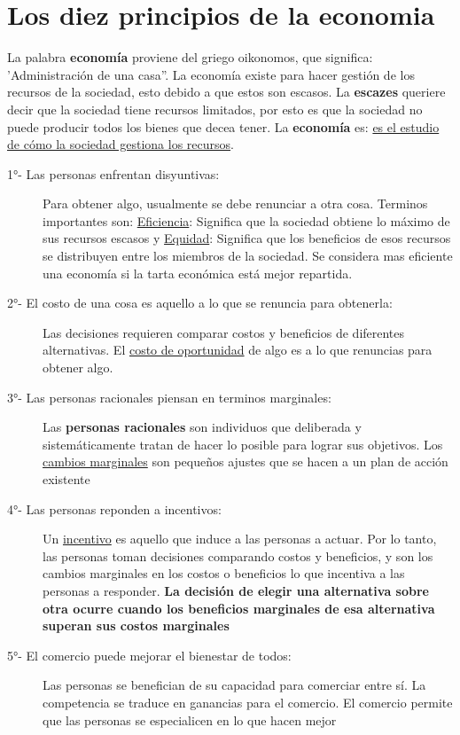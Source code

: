 \newpage


\section{Los diez principios de la economia}

La palabra \textbf{economía} proviene del griego oikonomos, que significa: 'Administración de una casa''. 
La economía existe para hacer gestión de los recursos de la sociedad, esto debido a que estos son escasos. 
La \textbf{escazes} queriere decir que la sociedad tiene recursos limitados, por esto es que la sociedad no puede
producir todos los bienes que decea tener. La {\bf economía} es: \underline{es el estudio de cómo la sociedad gestiona los recursos}.


\begin{description}
  \item [\large 1°- Las personas enfrentan disyuntivas:] Para obtener algo, usualmente se debe renunciar a otra cosa. Terminos importantes son: \underline{Eficiencia}: Significa que la sociedad obtiene lo máximo de sus recursos escasos y \underline{Equidad}: Significa que los beneficios de esos recursos se distribuyen entre los miembros de la sociedad. Se considera mas eficiente una economía si la tarta económica está mejor repartida.
  \item [\large 2°- El costo de una cosa es aquello a lo que se renuncia para obtenerla:] Las decisiones requieren comparar costos y beneficios de diferentes alternativas. El \underline{costo de oportunidad} de algo es a lo que renuncias para obtener algo.
  \item [\large 3°- Las personas racionales piensan en terminos marginales:] Las {\bf personas racionales} son individuos que deliberada y sistemáticamente tratan de hacer lo posible para lograr sus objetivos. Los \underline{cambios marginales} son pequeños ajustes que se hacen a un plan de acción existente
  \item [\large 4°- Las personas reponden a incentivos:] Un \underline{incentivo} es aquello que induce a las personas a actuar. Por lo tanto, las personas toman decisiones comparando costos y beneficios, y son los cambios marginales en los costos o beneficios lo que incentiva a las personas a responder. {\bf La decisión de elegir una alternativa sobre otra ocurre cuando los beneficios marginales de esa alternativa superan sus costos marginales}
  \item [\large 5°- El comercio puede mejorar el bienestar de todos:] Las personas se benefician de su capacidad para comerciar entre sí. La competencia se traduce en ganancias para el comercio. El comercio permite que las personas se especialicen en lo que hacen mejor

\end{description}
